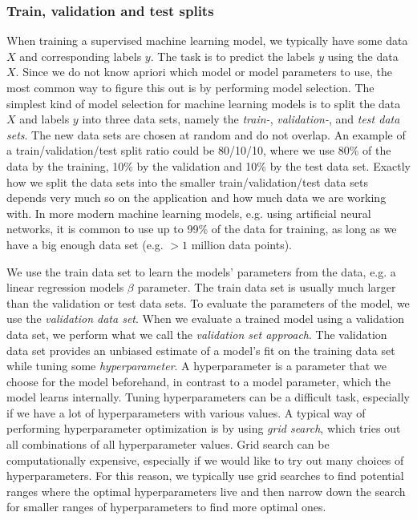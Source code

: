 \subsubsection{Train, validation and test splits}
\label{sec:train-val-test-splits}
When training a supervised machine learning model, we typically have some data $X$ and corresponding labels $y$. The task is to predict the labels $y$ using the data $X$. Since we do not know apriori which model or model parameters to use, the most common way to figure this out is by performing model selection. The simplest kind of model selection for machine learning models is to split the data $X$ and labels $y$ into three data sets, namely the \textit{train-}, \textit{validation-}, and \textit{test data sets}. The new data sets are chosen at random and do not overlap. An example of a train/validation/test split ratio could be 80/10/10, where we use 80\% of the data by the training, 10\% by the validation and 10\% by the test data set. Exactly how we split the data sets into the smaller train/validation/test data sets depends very much so on the application and how much data we are working with. In more modern machine learning models, e.g. using artificial neural networks, it is common to use up to 99\% of the data for training, as long as we have a big enough data set (e.g. $>1$ million data points).

We use the train data set to learn the models' parameters from the data, e.g. a linear regression models $\beta$ parameter. The train data set is usually much larger than the validation or test data sets. To evaluate the parameters of the model, we use the \textit{validation data set}. When we evaluate a trained model using a validation data set, we perform what we call the \textit{validation set approach}. The validation data set provides an unbiased estimate of a model's fit on the training data set while tuning some \textit{hyperparameter}. A hyperparameter is a parameter that we choose for the model beforehand, in contrast to a model parameter, which the model learns internally. Tuning hyperparameters can be a difficult task, especially if we have a lot of hyperparameters with various values. A typical way of performing hyperparameter optimization is by using \textit{grid search}, which tries out all combinations of all hyperparameter values. Grid search can be computationally expensive, especially if we would like to try out many choices of hyperparameters. For this reason, we typically use grid searches to find potential ranges where the optimal hyperparameters live and then narrow down the search for smaller ranges of hyperparameters to find more optimal ones.

